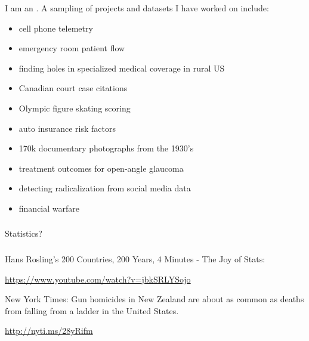 \documentclass[xetex,mathserif,serif,aspectratio=169]{beamer}
\begin{document}
\begin{frame}[fragile]

I am an . A sampling of projects and datasets
I have worked on include:
\begin{itemize}
\item cell phone telemetry
\item emergency room patient flow
\item finding holes in specialized medical coverage in rural US
\item Canadian court case citations
\item Olympic figure skating scoring
\item auto insurance risk factors
\item 170k documentary photographs from the 1930's
\item treatment outcomes for open-angle glaucoma
\item detecting radicalization from social media data
\item financial warfare
\end{itemize}

\end{frame}

\begin{frame}[fragile] \frametitle{}

\begin{flushright}
{\sc\fontsize{1cm}{0cm}\selectfont \textcolor{solarized@blue}{Statistics?}}
\end{flushright}

\end{frame}

\begin{frame}[fragile] \frametitle{}

Hans Rosling's 200 Countries, 200 Years, 4 Minutes - The Joy of Stats:
\begin{center}
\url{https://www.youtube.com/watch?v=jbkSRLYSojo}
\end{center}

\end{frame}

\begin{frame}[fragile]

New York Times: Gun homicides in New Zealand are about as common as deaths from
falling from a ladder in the United States.

\begin{center}
\url{http://nyti.ms/28yRifm}
\end{center}

\end{frame}
\end{document}
